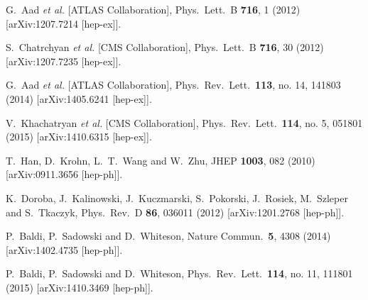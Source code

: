   G.~Aad {\it et al.}  [ATLAS Collaboration],
  Phys.\ Lett.\ B {\bf 716}, 1 (2012)
  [arXiv:1207.7214 [hep-ex]].


  S.~Chatrchyan {\it et al.}  [CMS Collaboration],
  Phys.\ Lett.\ B {\bf 716}, 30 (2012)
  [arXiv:1207.7235 [hep-ex]].

  G.~Aad {\it et al.}  [ATLAS Collaboration],
  Phys.\ Rev.\ Lett.\  {\bf 113}, no. 14, 141803 (2014)
  [arXiv:1405.6241 [hep-ex]].


  V.~Khachatryan {\it et al.}  [CMS Collaboration],
  Phys.\ Rev.\ Lett.\  {\bf 114}, no. 5, 051801 (2015)
  [arXiv:1410.6315 [hep-ex]].


  T.~Han, D.~Krohn, L.~T.~Wang and W.~Zhu,
  JHEP {\bf 1003}, 082 (2010)
  [arXiv:0911.3656 [hep-ph]].

  K.~Doroba, J.~Kalinowski, J.~Kuczmarski, S.~Pokorski, J.~Rosiek, M.~Szleper and S.~Tkaczyk,
  Phys.\ Rev.\ D {\bf 86}, 036011 (2012)
  [arXiv:1201.2768 [hep-ph]].



  P.~Baldi, P.~Sadowski and D.~Whiteson,
  Nature Commun.\  {\bf 5}, 4308 (2014)
  [arXiv:1402.4735 [hep-ph]].

  P.~Baldi, P.~Sadowski and D.~Whiteson,
  Phys.\ Rev.\ Lett.\  {\bf 114}, no. 11, 111801 (2015)
  [arXiv:1410.3469 [hep-ph]].
